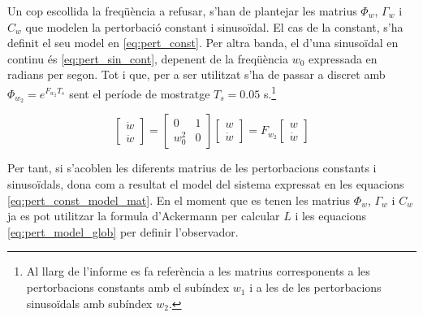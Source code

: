 \documentclass[12pt,a4paper,final,twoside,openright]{report}
\begin{document}
\vspace{100pt}
Un cop escollida la freqüència a refusar, s'han de plantejar les matrius $\Phi_w$, $\Gamma_w$ i $C_w$ que modelen la pertorbació constant i sinusoïdal. El cas de la constant, s'ha definit el seu model en \eqref{eq:pert_const}. Per altra banda, el d'una sinusoïdal en continu és \eqref{eq:pert_sin_cont}, depenent de la freqüència $w_0$ expressada en radians per segon. Tot i que, per a ser utilitzat s'ha de passar a discret amb $\Phi_{w_2}=e^{F_{w_2} T_s}$ sent el període de mostratge $T_s=0.05$ s.\footnote{Al llarg de l'informe es fa referència a les matrius corresponents a les pertorbacions constants amb el subíndex $w_1$ i a les de les pertorbacions sinusoïdals amb subíndex $w_2$.}

\begin{equation}\label{eq:pert_sin_cont}
\begin{bmatrix}
\dot{w}\\
\ddot{w}
\end{bmatrix} = \begin{bmatrix}
0 & 1\\
w_0^2 & 0
\end{bmatrix} \begin{bmatrix}
w\\
\dot{w}
\end{bmatrix} = F_{w_2} \begin{bmatrix}
w\\
\dot{w}
\end{bmatrix}
\end{equation}

Per tant, si s'acoblen les diferents matrius de les pertorbacions constants i sinusoïdals, dona com a resultat el model del sistema expressat en les equacions \eqref{eq:pert_const_model_mat}. En el moment que es tenen les matrius $\Phi_w$, $\Gamma_w$ i $C_w$ ja es pot utilitzar la formula d'Ackermann per calcular $L$ i les equacions \eqref{eq:pert_model_glob} per definir l'observador.
\end{document}
